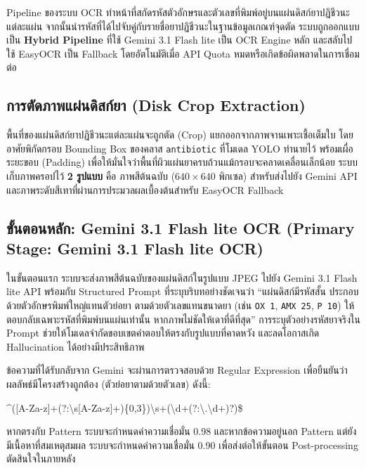 Pipeline ของระบบ OCR ทำหน้าที่สกัดรหัสตัวอักษรและตัวเลขที่พิมพ์อยู่บนแผ่นดิสก์ยาปฏิชีวนะแต่ละแผ่น จากนั้นนำรหัสที่ได้ไปจับคู่กับรายชื่อยาปฏิชีวนะในฐานข้อมูลเกณฑ์จุดตัด ระบบถูกออกแบบเป็น \textbf{Hybrid Pipeline} ที่ใช้ Gemini 3.1 Flash lite เป็น OCR Engine หลัก และสลับไปใช้ EasyOCR เป็น Fallback โดยอัตโนมัติเมื่อ API Quota หมดหรือเกิดข้อผิดพลาดในการเชื่อมต่อ

\subsection{การตัดภาพแผ่นดิสก์ยา (Disk Crop Extraction)}

พื้นที่ของแผ่นดิสก์ยาปฏิชีวนะแต่ละแผ่นจะถูกตัด (Crop) แยกออกจากภาพจานเพาะเชื้อเต็มใบ โดยอาศัยพิกัดกรอบ Bounding Box ของคลาส \texttt{antibiotic} ที่โมเดล YOLO ทำนายไว้ พร้อมเผื่อระยะขอบ (Padding) เพื่อให้มั่นใจว่าพื้นที่ผิวแผ่นยาครบถ้วนแม้กรอบจะคลาดเคลื่อนเล็กน้อย ระบบเก็บภาพครอปไว้ \textbf{2 รูปแบบ} คือ ภาพสีต้นฉบับ ($640 \times 640$ พิกเซล) สำหรับส่งไปยัง Gemini API และภาพระดับสีเทาที่ผ่านการประมวลผลเบื้องต้นสำหรับ EasyOCR Fallback

\subsection{ขั้นตอนหลัก: Gemini 3.1 Flash lite OCR (Primary Stage: Gemini 3.1 Flash lite OCR)}

ในขั้นตอนแรก ระบบจะส่งภาพสีต้นฉบับของแผ่นดิสก์ในรูปแบบ JPEG ไปยัง Gemini 3.1 Flash lite API พร้อมกับ Structured Prompt ที่ระบุบริบทอย่างชัดเจนว่า ``แผ่นดิสก์มีรหัสสั้น ประกอบด้วยตัวอักษรพิมพ์ใหญ่แทนตัวย่อยา ตามด้วยตัวเลขแทนขนาดยา (เช่น \texttt{OX 1}, \texttt{AMX 25}, \texttt{P 10}) ให้ตอบกลับเฉพาะรหัสที่พิมพ์บนแผ่นเท่านั้น หากภาพไม่ชัดให้เดาที่ดีที่สุด'' การระบุตัวอย่างรหัสยาจริงใน Prompt ช่วยให้โมเดลจำกัดขอบเขตคำตอบให้ตรงกับรูปแบบที่คาดหวัง และลดโอกาสเกิด Hallucination ได้อย่างมีประสิทธิภาพ

ข้อความที่ได้รับกลับจาก Gemini จะผ่านการตรวจสอบด้วย Regular Expression เพื่อยืนยันว่าผลลัพธ์มีโครงสร้างถูกต้อง (ตัวย่อยาตามด้วยตัวเลข) ดังนี้:
\begin{center}
  \small\ttfamily\^{}([A-Za-z]+(?:\textbackslash{}s[A-Za-z]+)\{0,3\})\textbackslash{}s+(\textbackslash{}d+(?:\textbackslash{}.\textbackslash{}d+)?)\$
\end{center} หากตรงกับ Pattern ระบบจะกำหนดค่าความเชื่อมั่น 0.98 และหากข้อความอยู่นอก Pattern แต่ยังมีเนื้อหาที่สมเหตุสมผล ระบบจะกำหนดค่าความเชื่อมั่น 0.90 เพื่อส่งต่อให้ขั้นตอน Post-processing ตัดสินใจในภายหลัง

